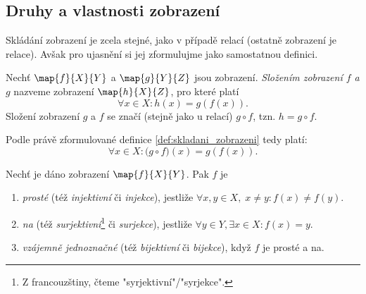 \subsection{Druhy a vlastnosti zobrazení}
Skládání zobrazení je zcela stejné, jako v případě relací (ostatně zobrazení je relace). Avšak pro ujasnění si jej zformulujme jako samostatnou definici.
\begin{definition}\label{def:skladani_zobrazeni}
    Nechť $\map{f}{X}{Y}$ a $\map{g}{Y}{Z}$ jsou zobrazení. \emph{Složením zobrazení $f$ a $g$} nazveme zobrazení $\map{h}{X}{Z}$, pro které platí
    \begin{equation*}
        \forall x\in X: h(x)=g(f(x)).
    \end{equation*}
    Složení zobrazení $g$ a $f$ se značí (stejně jako u relací) $g\circ f$, tzn. $h=g \circ f$.
\end{definition}
Podle právě zformulované definice \ref{def:skladani_zobrazeni} tedy platí:
\begin{equation*}
    \forall x\in X: \big(g\circ f\big)(x)=g(f(x)).
\end{equation*}
\needspace{1cm}
\begin{definition}\label{def:druhy_zobrazeni}
    Nechť je dáno zobrazení $\map{f}{X}{Y}$. Pak $f$ je
    \begin{enumerate}[label=(\roman*)]
        \item \emph{prosté} (též \emph{injektivní} či \emph{injekce}), jestliže $\forall x,y\in X,\;x\neq y: f(x)\neq f(y)$.
        \item \emph{na} (též \emph{surjektivní}\footnote{Z francouzštiny, čteme "syrjektivní"/"syrjekce".} či \emph{surjekce}), jestliže $\forall y\in Y, \exists x\in X: f(x)=y$.
        \item \emph{vzájemně jednoznačné} (též \emph{bijektivní} či \emph{bijekce}), když $f$ je prosté a na.
    \end{enumerate}
\end{definition}
